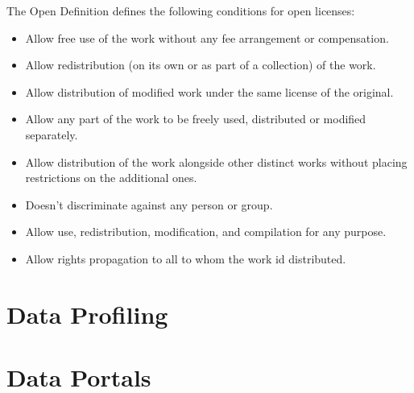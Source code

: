 The Open Definition defines the following conditions for open licenses:

\begin{itemize}
	\item Allow free use of the work without any fee arrangement or compensation.
	\item Allow redistribution (on its own or as part of a collection) of the work.
	\item Allow distribution of modified work under the same license of the original.
	\item Allow any part of the work to be freely used, distributed or modified separately.
	\item Allow distribution of the work alongside other distinct works without placing restrictions on the additional ones.
	\item Doesn't discriminate against any person or group.
	\item Allow use, redistribution, modification, and compilation for any purpose.
	\item Allow rights propagation to all to whom the work id distributed.
\end{itemize}


\begin{figure}[ht!]
\end{figure}

\section{Data Profiling}\label{sec:dataPortals}

\section{Data Portals}\label{sec:dataPortals}


